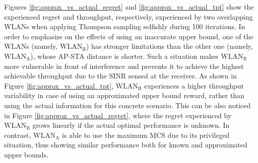 \documentclass[preprint,12pt]{elsarticle}
\begin{document}
Figures \ref{fig:approx_vs_actual_regret} and \ref{fig:approx_vs_actual_tpt} show the experienced regret and throughput, respectively, experienced by two overlapping WLANs when applying Thompson sampling selfishly during 100 iterations. In order to emphasize on the effects of using an inaccurate upper bound, one of the WLANs (namely, $\text{WLAN}_\text{B}$) has stronger limitations than the other one (namely, $\text{WLAN}_\text{A}$), whose AP-STA distance is shorter. Such a situation makes $\text{WLAN}_\text{B}$ more vulnerable in front of interference and prevents it to achieve the highest achievable throughput due to the SINR sensed at the receiver. As shown in Figure \ref{fig:approx_vs_actual_tpt}, $\text{WLAN}_\text{B}$ experiences a higher throughput variability in case of using an approximated upper bound reward, rather than using the actual information for this concrete scenario. This can be also noticed in Figure \ref{fig:approx_vs_actual_regret}, where the regret experienced by $\text{WLAN}_\text{B}$ grows linearly if the actual optimal performance is unknown. In contrast, $\text{WLAN}_\text{A}$ is able to use the maximum MCS due to its privileged situation, thus showing similar performance both for known and approximated upper bounds.
\end{document}
